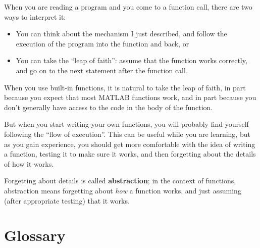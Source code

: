 \documentclass[
]{book}
\numberwithin{Answer}{chapter}
\numberwithin{Exercise}{chapter}
\begin{document}
When you are reading a program and you come to a function call,
there are two ways to interpret it:

\begin{itemize}

\item You can think about the mechanism I just described,
and follow the execution of the program into the function and back, or

\item You can take the ``leap of faith'': assume that the function
works correctly, and go on to the next statement after the function call.

\end{itemize}

When you use built-in functions, it is natural to take the leap
of faith, in part because you expect that most
MATLAB functions work, and in part because you don't
generally have access to the code in the body of the function.

But when you start writing your own functions, you will probably
find yourself following the ``flow of execution''.  This can
be useful while you are learning, but as you gain experience, you
should get more comfortable with the idea of writing a function,
testing it to make sure it works, and then forgetting about the
details of how it works.


Forgetting about details is called {\bf abstraction}; in the context
of functions, abstraction means forgetting about {\em how} a function
works, and just assuming (after appropriate testing) that it works.


\section{Glossary}
\end{document}
